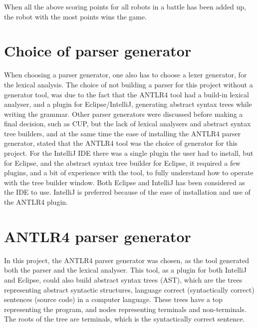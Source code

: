 When all the above scoring points for all robots in a battle has been added up, the robot with the most points wins the game.


\section{Choice of parser generator}
\label{sec:ParserGenerator}
When choosing a parser generator, one also has to choose a lexer generator, for the lexical analysis. The choice of not building a parser for this project without a generator tool, was due to the fact that the ANTLR4 tool had a build-in lexical analyser, and a plugin for Eclipse/IntelliJ, generating abstract syntax trees while writing the grammar. Other parser generators were discussed before making a final decision, such as CUP, but the lack of lexical analysers and abstract syntax tree builders, and at the same time the ease of installing the ANTLR4 parser generator, stated that the ANTLR4 tool was the choice of generator for this project. For the IntelliJ IDE there was a single plugin the user had to install, but for Eclipse, and the abstract syntax tree builder for Eclipse, it required a few plugins, and a bit of experience with the tool, to fully understand how to operate with the tree builder window. Both Eclipse and IntelliJ has been considered as the IDE to use. IntelliJ is preferred because of the ease of installation and use of the ANTLR4 plugin.
 
\section{ANTLR4 parser generator}
\label{Antlr}
In this project, the ANTLR4 parser generator was chosen, as the tool generated both the parser and the lexical analyser. This tool, as a plugin for both IntelliJ and Eclipse, could also build abstract syntax trees (AST), which are the trees representing abstract syntactic structures, language correct (syntactically correct) sentences (source code) in a computer language. These trees have a top representing the program, and nodes representing terminals and non-terminals. The roots of the tree are terminals, which is the syntactically correct sentence.


